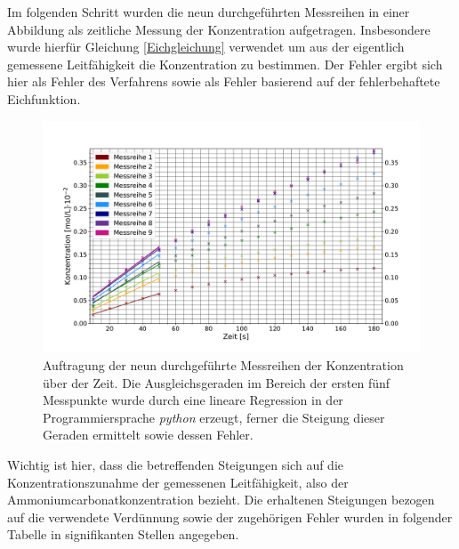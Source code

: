 Im folgenden Schritt wurden die neun durchgeführten Messreihen in einer Abbildung als zeitliche Messung der Konzentration aufgetragen. Insbesondere wurde hierfür Gleichung \ref{Eichgleichung} verwendet um aus der eigentlich gemessene Leitfähigkeit die Konzentration zu bestimmen. Der Fehler ergibt sich hier als Fehler des Verfahrens sowie als Fehler basierend auf der fehlerbehaftete Eichfunktion.
\begin{figure}[H]
	\centering	
	\begin{minipage}{1\textwidth}
		\includegraphics[width=\columnwidth]{Bilder/Messreihe.pdf}
	\end{minipage}
	\caption{Auftragung der neun durchgeführte Messreihen der Konzentration über der Zeit. Die Ausgleichsgeraden im Bereich der ersten fünf Messpunkte wurde durch eine lineare Regression in der Programmiersprache \textit{python} erzeugt, ferner die Steigung dieser Geraden ermittelt sowie dessen Fehler.}
	\label{Messreihe}
\end{figure}
Wichtig ist hier, dass die betreffenden Steigungen sich auf die Konzentrationszunahme der gemessenen Leitfähigkeit, also der Ammoniumcarbonatkonzentration bezieht. Die erhaltenen Steigungen bezogen auf die verwendete Verdünnung sowie der zugehörigen Fehler wurden in folgender Tabelle in signifikanten Stellen angegeben.
